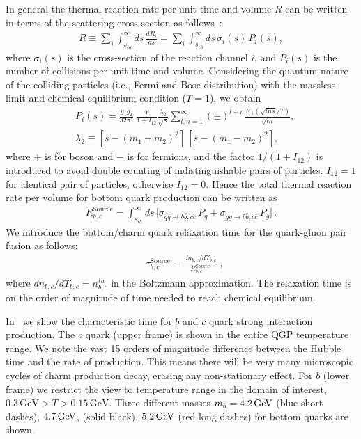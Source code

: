 In general the thermal reaction rate per unit time and volume $R$ can be written in terms of the scattering cross-section as follows~\cite{Letessier:2002ony}:
\begin{align}
R\equiv\sum_i\int_{s_{th}}^\infty\!ds\,\frac{dR_i}{ds}=\sum_i\int_{s_{th}}^\infty\!ds\,\sigma_i(s)\,P_i(s),
\end{align}
where $\sigma_i(s)$ is the cross-section of the reaction channel $i$, and $P_i(s)$ is the number of collisions per unit time and volume. Considering the quantum nature of the colliding particles (i.e., Fermi and Bose distribution) with the massless limit and chemical equilibrium condition ($\Upsilon=1$), we obtain~\cite{Letessier:2002ony}
\begin{align}
&P_i(s)=\frac{g_1g_2}{32\pi^4}\,\frac{T}{1+I_{12}}\frac{\lambda_2}{\sqrt{s}}\!\sum_{l,n=1}^{\infty}\!(\pm)^{l+n}\frac{K_1(\sqrt{lns}/T)}{\sqrt{ln}},\\
&\lambda_2\equiv\left[s-\left(m_1+m_2\right)^2\right]\,\left[s-\left(m_1-m_2\right)^2\right],
\end{align}
where $+$ is for boson and $-$ is for fermions, and the factor $1/(1+I_{12})$ is introduced to avoid double counting of indistinguishable pairs of particles. $I_{12}=1$ for identical pair of particles, otherwise $I_{12}=0$. Hence the total thermal reaction rate per volume for bottom quark production can be written as
\begin{align}
\label{Bquark_Source}
R^{\mathrm{Source}}_{b,c}=\int^\infty_{s_{th}}ds\,\bigg[\sigma_{q\bar{q}\rightarrow b\bar{b},c\bar{c}}\,P_q+\sigma_{gg\rightarrow b\bar{b},c\bar{c}}\,P_g\bigg]
\,.
\end{align}
We introduce the bottom/charm quark relaxation time for the quark-gluon pair fusion as follows:
\begin{align}
\label{relaxation_time}
&{\tau_{b,c}^{\mathrm{Source}}}\equiv\frac{dn_{b,c}/d\Upsilon_{b,c}}{R^{\mathrm{Source}}_{b,c}}\;,
\end{align}
where $dn_{b,c}/d\Upsilon_{b,c}=n^{th}_{b,c}$ in the Boltzmann approximation. The relaxation time is on the order of magnitude of time needed to reach chemical equilibrium. 

In~ we show the characteristic time for $b$ and $c$ quark strong interaction production. The $c$ quark (upper frame) is shown in the entire QGP temperature range. We note the vast 15 orders of magnitude difference between the Hubble time and the rate of production. This means there will be very many microscopic cycles of charm production decay, erasing any non-stationary effect. For $b$ (lower frame) we restrict the view to temperature range in the domain of interest, $ 0.3\,\mathrm{GeV}>T> 0.15\,\mathrm{GeV}$. Three different masses $m_{b}=4.2\text{\,GeV}$ (blue short dashes), $4.7\text{\,GeV}$, (solid black), $5.2\text{\,GeV}$ (red long dashes) for bottom quarks are shown. 
 
